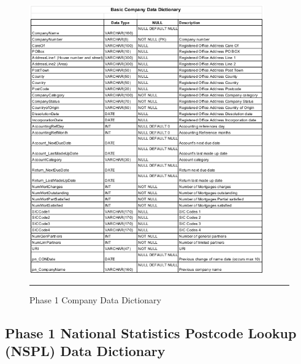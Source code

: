 \begin{figure}[H]
	\centering	
	\includegraphics[width=0.9\textwidth]{Data-Dictionary/company-data-dictionary.png}
	\rule{35em}{0.5pt}
	\caption[Phase 1 Company Data Dictionary]{Phase 1 Company Data Dictionary}
\end{figure}

\subsection{Phase 1 National Statistics Postcode Lookup (NSPL) Data Dictionary}

